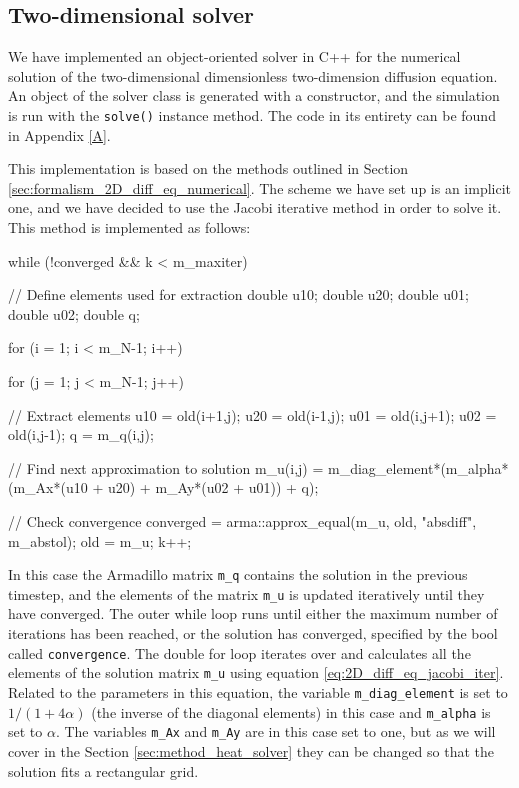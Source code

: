 \documentclass[reprint,english,notitlepage]{revtex4-1}  %
\begin{document}
\subsection{Two-dimensional solver} \label{sec:method_2D_solver}

We have implemented an object-oriented solver in C++ for the numerical solution of the two-dimensional dimensionless two-dimension diffusion equation. An object of the solver class is generated with a constructor, and the simulation is run with the \verb+solve()+ instance method. The code in its entirety can be found in Appendix \ref{A}. 

This implementation is based on the methods outlined in Section \ref{sec:formalism_2D_diff_eq_numerical}. The scheme we have set up is an implicit one, and we have decided to use the Jacobi iterative method in order to solve it. This method is implemented as follows:

\begin{cpp}
while (!converged && k < m_maxiter){
  // Define elements used for extraction
  double u10;
  double u20;
  double u01;
  double u02;
  double q;

  for (i = 1; i < m_N-1; i++){
    for (j = 1; j < m_N-1; j++){
      // Extract elements
      u10 = old(i+1,j);
      u20 = old(i-1,j);
      u01 = old(i,j+1);
      u02 = old(i,j-1);
      q = m_q(i,j);

      // Find next approximation to solution
      m_u(i,j) = m_diag_element*(m_alpha*(m_Ax*(u10 + u20)
      		   + m_Ay*(u02 + u01)) + q);
    }
  }
  // Check convergence
  converged = arma::approx_equal(m_u, old, "absdiff", m_abstol);
  old = m_u;
  k++;
}
\end{cpp}

In this case the Armadillo matrix \verb+m_q+ contains the solution in the previous timestep, and the elements of the matrix \verb+m_u+ is updated iteratively until they have converged. The outer while loop runs until either the maximum number of iterations has been reached, or the solution has converged, specified by the bool called \verb+convergence+. The double for loop iterates over and calculates all the elements of the solution matrix \verb+m_u+ using equation \eqref{eq:2D_diff_eq_jacobi_iter}. Related to the parameters in this equation, the variable \verb+m_diag_element+ is set to $1/(1 + 4\alpha)$ (the inverse of the diagonal elements) in this case and \verb+m_alpha+ is set to $\alpha$. The variables \verb+m_Ax+ and \verb+m_Ay+ are in this case set to one, but as we will cover in the Section \ref{sec:method_heat_solver} they can be changed so that the solution fits a rectangular grid. 
\end{document}
